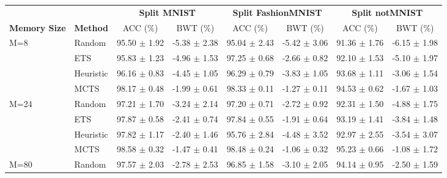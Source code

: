 
\begin{tabular}{llcccccc}
\toprule
                       &                 & \multicolumn{2}{c}{\textbf{Split MNIST}} & \multicolumn{2}{c}{\textbf{Split FashionMNIST}} & \multicolumn{2}{c}{\textbf{Split notMNIST}} \\
\cmidrule(lr){3-4} \cmidrule(lr){5-6} \cmidrule(lr){7-8}
\textbf{Memory Size}   & \textbf{Method} & ACC (\%)            & BWT (\%)           & ACC (\%)               & BWT (\%)               & ACC (\%)             & BWT (\%)             \\
\midrule
\multirow{4}{*}{M=8}   & Random          & 95.50 $\pm$ 1.92      & -5.38 $\pm$ 2.38     & 95.04 $\pm$ 2.43         & -5.42 $\pm$ 3.06         & 91.36 $\pm$ 1.76       & -6.15 $\pm$ 1.98       \\
                       & ETS             & 95.83 $\pm$ 1.23      & -4.96 $\pm$ 1.53     & 97.25 $\pm$ 0.68         & -2.66 $\pm$ 0.82         & 92.10 $\pm$ 1.53       & -5.10 $\pm$ 1.97       \\
                       & Heuristic         & 96.16 $\pm$ 0.83      & -4.45 $\pm$ 1.05     & 96.29 $\pm$ 0.79         & -3.83 $\pm$ 1.05         & 93.68 $\pm$ 1.11       & -3.06 $\pm$ 1.54       \\
                       & MCTS            & 98.17 $\pm$ 0.48      & -1.99 $\pm$ 0.61     & 98.33 $\pm$ 0.11         & -1.27 $\pm$ 0.11         & 94.53 $\pm$ 0.62       & -1.67 $\pm$ 1.03       \\
\midrule
\multirow{4}{*}{M=24}  & Random          & 97.21 $\pm$ 1.70      & -3.24 $\pm$ 2.14     & 97.20 $\pm$ 0.71         & -2.72 $\pm$ 0.92         & 92.31 $\pm$ 1.50       & -4.88 $\pm$ 1.75       \\
                       & ETS             & 97.87 $\pm$ 0.58      & -2.41 $\pm$ 0.74     & 97.84 $\pm$ 0.55         & -1.91 $\pm$ 0.64         & 93.19 $\pm$ 1.41       & -3.84 $\pm$ 1.48       \\
                       & Heuristic         & 97.82 $\pm$ 1.17      & -2.40 $\pm$ 1.46     & 95.76 $\pm$ 2.84         & -4.48 $\pm$ 3.52         & 92.97 $\pm$ 2.55       & -3.54 $\pm$ 3.07       \\
                       & MCTS            & 98.58 $\pm$ 0.32      & -1.47 $\pm$ 0.41     & 98.48 $\pm$ 0.24         & -1.06 $\pm$ 0.32         & 95.23 $\pm$ 0.66       & -1.08 $\pm$ 1.72       \\
\midrule
\multirow{4}{*}{M=80}  & Random          & 97.57 $\pm$ 2.03      & -2.78 $\pm$ 2.53     & 96.85 $\pm$ 1.58         & -3.10 $\pm$ 2.05         & 94.14 $\pm$ 0.95       & -2.50 $\pm$ 1.59       \\

\end{tabular}
